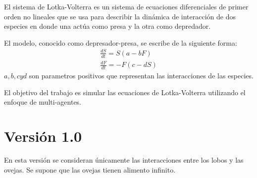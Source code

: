 \documentclass[12pt, twocolumns]{article}
\begin{document}
El sistema de Lotka-Volterra es un sistema de ecuaciones diferenciales de primer orden no lineales que se usa para describir la din\'amica de interacci\'on de dos especies en donde una act\'ua como presa y la otra como depredador.

El modelo, conocido como depresador-presa, se escribe de la siguiente forma:
\begin{equation}
\begin{split}
\frac{dS}{dt} = S(a-bF) \\
\frac{dF}{dt} = -F(c-dS)
\end{split}
\end{equation} 
$a, b, c y d$ son parametros positivos que representan las interacciones de las especies.

El objetivo del trabajo es simular las ecuaciones de Lotka-Volterra utilizando el enfoque de multi-agentes. 

\section*{Versi\'on 1.0}

En esta versi\'on se consideran \'unicamente las interacciones entre los lobos y las ovejas. Se supone que las ovejas tienen alimento infinito.






\begin{thebibliography}{00}


\bibitem{}

\end{thebibliography}
\end{document}
